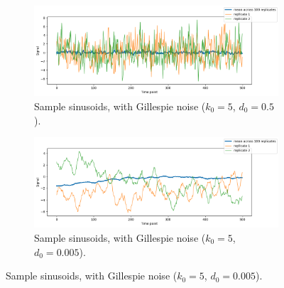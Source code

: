 \begin{figure}
  \centering
  \begin{subfigure}[t]{0.45\textwidth}
  \centering
    \includegraphics[width=\linewidth]{gillespie_k5_d0p5_mean.png}
    \caption{
      Sample sinusoids, with Gillespie noise ($k_{0} = 5$, $d_{0} = 0.5$).
    }
    \label{fig:acf-noisetimescale-highd0-ts}
  \end{subfigure}%
  \begin{subfigure}[t]{0.45\textwidth}
  \centering
    \includegraphics[width=\linewidth]{gillespie_k5_d0p005_mean.png}
    \caption{
      Sample sinusoids, with Gillespie noise ($k_{0} = 5$, $d_{0} = 0.005$).
    }
    \label{fig:acf-noisetimescale-lowd0-ts}
  \end{subfigure}


\end{figure}
